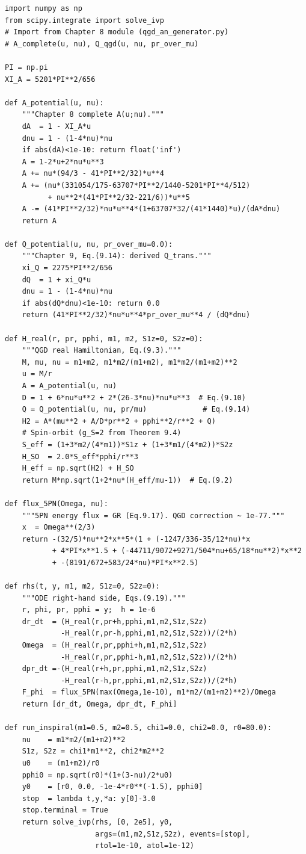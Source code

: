 \documentclass[11pt,a4paper]{article}
\theoremstyle{plain}
\theoremstyle{definition}
\theoremstyle{remark}
\begin{document}
\begin{lstlisting}[caption={QGD--EOB aligned-spin inspiral solver skeleton},label={lst:solver}]
import numpy as np
from scipy.integrate import solve_ivp
# Import from Chapter 8 module (qgd_an_generator.py)
# A_complete(u, nu), Q_qgd(u, nu, pr_over_mu)

PI = np.pi
XI_A = 5201*PI**2/656

def A_potential(u, nu):
    """Chapter 8 complete A(u;nu)."""
    dA  = 1 - XI_A*u
    dnu = 1 - (1-4*nu)*nu
    if abs(dA)<1e-10: return float('inf')
    A = 1-2*u+2*nu*u**3
    A += nu*(94/3 - 41*PI**2/32)*u**4
    A += (nu*(331054/175-63707*PI**2/1440-5201*PI**4/512)
          + nu**2*(41*PI**2/32-221/6))*u**5
    A -= (41*PI**2/32)*nu*u**4*(1+63707*32/(41*1440)*u)/(dA*dnu)
    return A

def Q_potential(u, nu, pr_over_mu=0.0):
    """Chapter 9, Eq.(9.14): derived Q_trans."""
    xi_Q = 2275*PI**2/656
    dQ  = 1 + xi_Q*u
    dnu = 1 - (1-4*nu)*nu
    if abs(dQ*dnu)<1e-10: return 0.0
    return (41*PI**2/32)*nu*u**4*pr_over_mu**4 / (dQ*dnu)

def H_real(r, pr, pphi, m1, m2, S1z=0, S2z=0):
    """QGD real Hamiltonian, Eq.(9.3)."""
    M, mu, nu = m1+m2, m1*m2/(m1+m2), m1*m2/(m1+m2)**2
    u = M/r
    A = A_potential(u, nu)
    D = 1 + 6*nu*u**2 + 2*(26-3*nu)*nu*u**3  # Eq.(9.10)
    Q = Q_potential(u, nu, pr/mu)             # Eq.(9.14)
    H2 = A*(mu**2 + A/D*pr**2 + pphi**2/r**2 + Q)
    # Spin-orbit (g_S=2 from Theorem 9.4)
    S_eff = (1+3*m2/(4*m1))*S1z + (1+3*m1/(4*m2))*S2z
    H_SO  = 2.0*S_eff*pphi/r**3
    H_eff = np.sqrt(H2) + H_SO
    return M*np.sqrt(1+2*nu*(H_eff/mu-1))  # Eq.(9.2)

def flux_5PN(Omega, nu):
    """5PN energy flux = GR (Eq.9.17). QGD correction ~ 1e-77."""
    x  = Omega**(2/3)
    return -(32/5)*nu**2*x**5*(1 + (-1247/336-35/12*nu)*x
           + 4*PI*x**1.5 + (-44711/9072+9271/504*nu+65/18*nu**2)*x**2
           + -(8191/672+583/24*nu)*PI*x**2.5)

def rhs(t, y, m1, m2, S1z=0, S2z=0):
    """ODE right-hand side, Eqs.(9.19)."""
    r, phi, pr, pphi = y;  h = 1e-6
    dr_dt  = (H_real(r,pr+h,pphi,m1,m2,S1z,S2z)
             -H_real(r,pr-h,pphi,m1,m2,S1z,S2z))/(2*h)
    Omega  = (H_real(r,pr,pphi+h,m1,m2,S1z,S2z)
             -H_real(r,pr,pphi-h,m1,m2,S1z,S2z))/(2*h)
    dpr_dt =-(H_real(r+h,pr,pphi,m1,m2,S1z,S2z)
             -H_real(r-h,pr,pphi,m1,m2,S1z,S2z))/(2*h)
    F_phi  = flux_5PN(max(Omega,1e-10), m1*m2/(m1+m2)**2)/Omega
    return [dr_dt, Omega, dpr_dt, F_phi]

def run_inspiral(m1=0.5, m2=0.5, chi1=0.0, chi2=0.0, r0=80.0):
    nu    = m1*m2/(m1+m2)**2
    S1z, S2z = chi1*m1**2, chi2*m2**2
    u0    = (m1+m2)/r0
    pphi0 = np.sqrt(r0)*(1+(3-nu)/2*u0)
    y0    = [r0, 0.0, -1e-4*r0**(-1.5), pphi0]
    stop  = lambda t,y,*a: y[0]-3.0
    stop.terminal = True
    return solve_ivp(rhs, [0, 2e5], y0,
                     args=(m1,m2,S1z,S2z), events=[stop],
                     rtol=1e-10, atol=1e-12)
\end{lstlisting}
\end{document}
